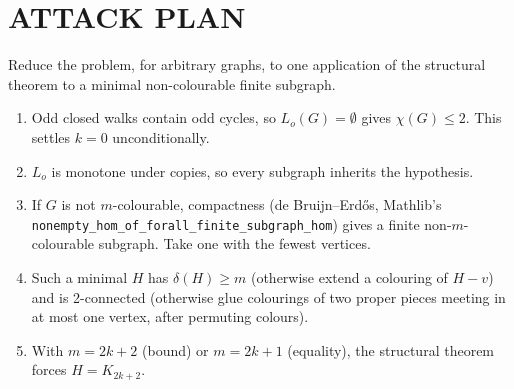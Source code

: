 \section{ATTACK PLAN}
Reduce the problem, for arbitrary graphs, to one application of the structural theorem to a minimal non-colourable finite subgraph.
\begin{enumerate}
\item Odd closed walks contain odd cycles, so $L_o(G)=\emptyset$ gives $\chi(G)\le2$. This settles $k=0$ unconditionally.
\item $L_o$ is monotone under copies, so every subgraph inherits the hypothesis.
\item If $G$ is not $m$-colourable, compactness (de Bruijn--Erd\H{o}s, Mathlib's \texttt{nonempty\_hom\_of\_forall\_finite\_subgraph\_hom}) gives a finite non-$m$-colourable subgraph. Take one with the fewest vertices.
\item Such a minimal $H$ has $\delta(H)\ge m$ (otherwise extend a colouring of $H-v$) and is 2-connected (otherwise glue colourings of two proper pieces meeting in at most one vertex, after permuting colours).
\item With $m=2k+2$ (bound) or $m=2k+1$ (equality), the structural theorem forces $H=K_{2k+2}$.
\end{enumerate}

